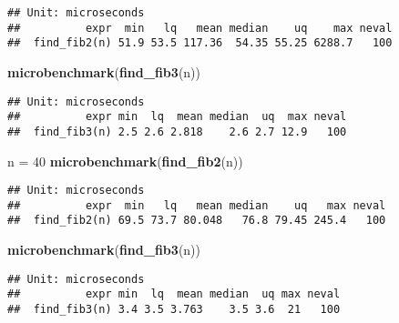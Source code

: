 \documentclass[
]{article}
\newenvironment{Shaded}{\begin{snugshade}}{\end{snugshade}}
\newcommand{\DecValTok}[1]{\textcolor[rgb]{0.00,0.00,0.81}{#1}}
\newcommand{\KeywordTok}[1]{\textcolor[rgb]{0.13,0.29,0.53}{\textbf{#1}}}
\newcommand{\NormalTok}[1]{#1}
\newcommand{\StringTok}[1]{\textcolor[rgb]{0.31,0.60,0.02}{#1}}
\begin{document}
\begin{verbatim}
## Unit: microseconds
##          expr  min   lq   mean median    uq    max neval
##  find_fib2(n) 51.9 53.5 117.36  54.35 55.25 6288.7   100
\end{verbatim}

\begin{Shaded}
\begin{Highlighting}[]
\KeywordTok{microbenchmark}\NormalTok{(}\KeywordTok{find\_fib3}\NormalTok{(n))}
\end{Highlighting}
\end{Shaded}

\begin{verbatim}
## Unit: microseconds
##          expr min  lq  mean median  uq  max neval
##  find_fib3(n) 2.5 2.6 2.818    2.6 2.7 12.9   100
\end{verbatim}

\begin{Shaded}
\begin{Highlighting}[]
\NormalTok{n =}\StringTok{ }\DecValTok{40}
\KeywordTok{microbenchmark}\NormalTok{(}\KeywordTok{find\_fib2}\NormalTok{(n))}
\end{Highlighting}
\end{Shaded}

\begin{verbatim}
## Unit: microseconds
##          expr  min   lq   mean median    uq   max neval
##  find_fib2(n) 69.5 73.7 80.048   76.8 79.45 245.4   100
\end{verbatim}

\begin{Shaded}
\begin{Highlighting}[]
\KeywordTok{microbenchmark}\NormalTok{(}\KeywordTok{find\_fib3}\NormalTok{(n))}
\end{Highlighting}
\end{Shaded}

\begin{verbatim}
## Unit: microseconds
##          expr min  lq  mean median  uq max neval
##  find_fib3(n) 3.4 3.5 3.763    3.5 3.6  21   100
\end{verbatim}
\end{document}
